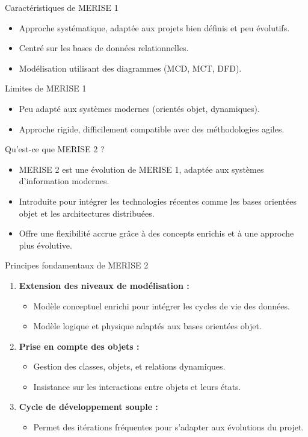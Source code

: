 \documentclass{beamer}
\begin{document}
\begin{frame}{Caractéristiques de MERISE 1}
\begin{itemize}
    \item Approche systématique, adaptée aux projets bien définis et peu évolutifs.
    \item Centré sur les bases de données relationnelles.
    \item Modélisation utilisant des diagrammes (MCD, MCT, DFD).
\end{itemize}
\end{frame}

\begin{frame}{Limites de MERISE 1}
\begin{itemize}
    \item Peu adapté aux systèmes modernes (orientés objet, dynamiques).
    \item Approche rigide, difficilement compatible avec des méthodologies agiles.
\end{itemize}
\end{frame}
\begin{frame}{Qu'est-ce que MERISE 2 ?}
\begin{itemize}
    \item MERISE 2 est une évolution de MERISE 1, adaptée aux systèmes d’information modernes.
    \item Introduite pour intégrer les technologies récentes comme les bases orientées objet et les architectures distribuées.
    \item Offre une flexibilité accrue grâce à des concepts enrichis et à une approche plus évolutive.
\end{itemize}
\end{frame}

\begin{frame}{Principes fondamentaux de MERISE 2}
\begin{enumerate}
    \item \textbf{Extension des niveaux de modélisation :}
    \begin{itemize}
        \item Modèle conceptuel enrichi pour intégrer les cycles de vie des données.
        \item Modèle logique et physique adaptés aux bases orientées objet.
    \end{itemize}
    \item \textbf{Prise en compte des objets :}
    \begin{itemize}
        \item Gestion des classes, objets, et relations dynamiques.
        \item Insistance sur les interactions entre objets et leurs états.
    \end{itemize}
    \item \textbf{Cycle de développement souple :}
    \begin{itemize}
        \item Permet des itérations fréquentes pour s’adapter aux évolutions du projet.
    \end{itemize}
\end{enumerate}
\end{frame}
\end{document}
